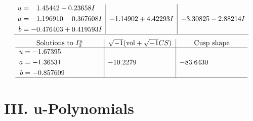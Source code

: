 \documentclass[1p]{elsarticle_modified}
\theoremstyle{definition}
\newcommand{\I}{\sqrt{-1}}
\begin{document}
$$\begin{array}{c|c|c}
\begin{aligned}
u &= \phantom{-}1.45442 - 0.23658 I \\
a &= -1.196910 - 0.367608 I \\
b &= -0.476403 + 0.419593 I\end{aligned}
 & -1.14902 + 4.42293 I & -3.30825 - 2.88214 I\\
 \hline 
 \end{array}$$\newpage$$\begin{array}{c|c|c}  
\text{Solutions to }I^u_{2}& \I (\text{vol} + \sqrt{-1}CS) & \text{Cusp shape}\\
 \hline 
\begin{aligned}
u &= -1.67395\phantom{ +0.000000I} \\
a &= -1.36531\phantom{ +0.000000I} \\
b &= -0.857609\phantom{ +0.000000I}\end{aligned}
 & -10.2279\phantom{ +0.000000I} & -83.6430\phantom{ +0.000000I}\\
 \hline 
 \end{array}$$\newpage
\newpage\renewcommand{\arraystretch}{1}
\centering \section*{ III. u-Polynomials}
\end{document}
